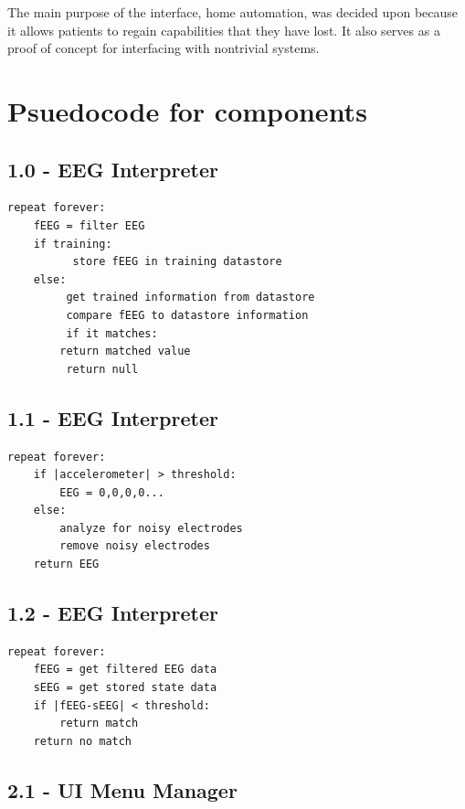 \documentclass{article}
\begin{document}
The main purpose of the interface, home automation, was decided upon because
it allows patients to regain capabilities that they have lost. It also
serves as a proof of concept for interfacing with nontrivial systems.

\newpage

\section{Psuedocode for components}

\subsection*{1.0 - EEG Interpreter}

\begin{lstlisting}
repeat forever:
    fEEG = filter EEG
    if training:
          store fEEG in training datastore
    else:
         get trained information from datastore
         compare fEEG to datastore information
         if it matches:
		return matched value
         return null
\end{lstlisting}

\subsection*{1.1 - EEG Interpreter}

\begin{lstlisting}
repeat forever:
    if |accelerometer| > threshold:
        EEG = 0,0,0,0...
    else:
        analyze for noisy electrodes
        remove noisy electrodes
    return EEG
\end{lstlisting}

\subsection*{1.2 - EEG Interpreter}

\begin{lstlisting}
repeat forever:
    fEEG = get filtered EEG data
    sEEG = get stored state data
    if |fEEG-sEEG| < threshold:
        return match
    return no match

\end{lstlisting}

\subsection*{2.1 - UI Menu Manager}
\end{document}
